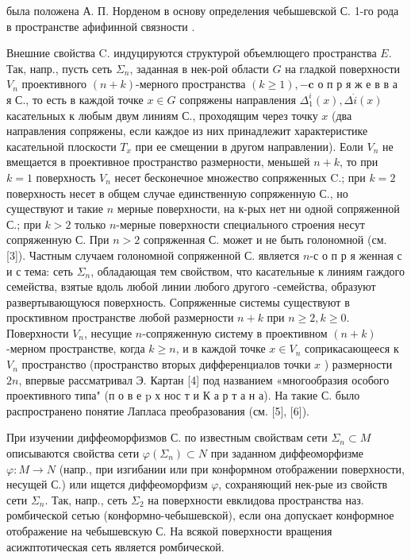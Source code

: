 \documentclass[10pt]{article}
\begin{document}
была положена А. П. Норденом в основу определения чебышевской С. 1-го рода в пространстве афифинной связности .



Внешние свойства $\mathrm{C}$. индуцируются структурой объемлющего пространства $E$. Так, напр., пусть сеть $\Sigma_{n}$, заданная в нек-рой области $G$ на гладкой поверхности $V_{n}$ проективного $(n+k)$-мерного пространства $(k \geqslant 1),-\mathbf{c}$ о п р я ж е в в а я С., то есть в каждой точке $x \in G$ сопряжены направления $\Delta_{1}^{i}(x), \Delta \dot{i}(x)$ касательных к любым двум линиям С., проходящим через точку $x$ (два направления сопряжены, если каждое из них принадлежит характеристике касательной плоскости $T_{x}$ при ее смещении в другом направлении). Еоли $V_{n}$ не вмещается в проективное пространство размерности, меньшей $n+k$, то при $k=1$ поверхность $V_{n}$ несет бесконечное множество сопряженных C.; при $k=2$ поверхность несет в общем случае единственную сопряженную С., но существуют и такие $n$ мерные поверхности, на к-рых нет ни одной сопряженной С.; при $k>2$ только $n$-мерные поверхности специального строения несут сопряженную С. При $n>2$ сопряженная С. может и не быть голономной (см. [3]). Частным случаем голономной сопряженной С. является $n$-с о п р я женная с и с тема: сеть $\Sigma_{n}$, обладающая тем свойством, что касательные к линиям гаждого семейства, взятые вдоль любой линии любого другого -семейства, образуют развертывающуюся поверхность. Сопряженные системы существуют в просктивном пространстве любой размерности $n+k$ при $n \geqslant 2, k \geqslant 0$. Поверхности $V_{n}$, несущие $n$-сопряженную систему в проективном $(n+k)$-мерном пространстве, когда $k \geqslant n$, и в каждой точке $x \in V_{n}$ соприкасающееся к $V_{n}$ пространство (пространство вторых дифференциалов точки $x$ ) размерности $2 n$, впервые рассматривал Э. Картан [4] под названием «многообразия особого проективного типа" (п о в е $\mathrm{p}$ х нос т и К а р т а н а). На такие С. было распространено понятие Лапласа преобразования (см. [5], [6]).



При изучении диффеоморфизмов С. по известным свойствам сети $\Sigma_{n} \subset M$ описываются свойства сети $\varphi\left(\Sigma_{n}\right) \subset N$ при заданном диффеоморфизме $\varphi: M \rightarrow N$ (напр., при изгибании или при конформном отображении поверхности, несущей С.) или ищется диффеоморфизм $\varphi$, сохраняющий нек-рые из свойств сети $\Sigma_{n}$. Так, напр., сеть $\Sigma_{2}$ на поверхности евклидова пространства наз. ромбической сетью (конформно-чебышевской), если она допускает конформное отображение на чебышевскую С. На всякой поверхности вращения асижптотическая сеть является ромбической.
\end{document}
